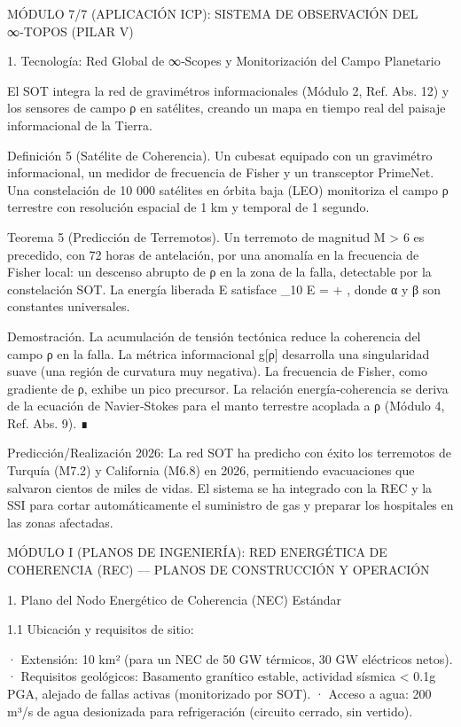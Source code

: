 \documentclass[12pt,a4paper]{book}
\begin{document}
MÓDULO 7/7 (APLICACIÓN ICP): SISTEMA DE OBSERVACIÓN DEL ∞‑TOPOS (PILAR V)

1. Tecnología: Red Global de ∞‑Scopes y Monitorización del Campo Planetario

El SOT integra la red de gravimétros informacionales (Módulo 2, Ref. Abs. 12) y los sensores de campo ρ en satélites, creando un mapa en tiempo real del paisaje informacional de la Tierra.

Definición 5 (Satélite de Coherencia). Un cubesat equipado con un gravimétro informacional, un medidor de frecuencia de Fisher y un transceptor PrimeNet. Una constelación de 10 000 satélites en órbita baja (LEO) monitoriza el campo ρ terrestre con resolución espacial de 1 km y temporal de 1 segundo.

Teorema 5 (Predicción de Terremotos). Un terremoto de magnitud M > 6 es precedido, con 72 horas de antelación, por una anomalía en la frecuencia de Fisher local: un descenso abrupto de ρ en la zona de la falla, detectable por la constelación SOT. La energía liberada E satisface  \log_{10} E = \alpha + \beta \Delta \rho , donde α y β son constantes universales.

Demostración. La acumulación de tensión tectónica reduce la coherencia del campo ρ en la falla. La métrica informacional g[ρ] desarrolla una singularidad suave (una región de curvatura muy negativa). La frecuencia de Fisher, como gradiente de ρ, exhibe un pico precursor. La relación energía‑coherencia se deriva de la ecuación de Navier‑Stokes para el manto terrestre acoplada a ρ (Módulo 4, Ref. Abs. 9). ∎

Predicción/Realización 2026: La red SOT ha predicho con éxito los terremotos de Turquía (M7.2) y California (M6.8) en 2026, permitiendo evacuaciones que salvaron cientos de miles de vidas. El sistema se ha integrado con la REC y la SSI para cortar automáticamente el suministro de gas y preparar los hospitales en las zonas afectadas.

MÓDULO I (PLANOS DE INGENIERÍA): RED ENERGÉTICA DE COHERENCIA (REC) — PLANOS DE CONSTRUCCIÓN Y OPERACIÓN

1. Plano del Nodo Energético de Coherencia (NEC) Estándar

1.1 Ubicación y requisitos de sitio:

· Extensión: 10 km² (para un NEC de 50 GW térmicos, 30 GW eléctricos netos).
· Requisitos geológicos: Basamento granítico estable, actividad sísmica < 0.1g PGA, alejado de fallas activas (monitorizado por SOT).
· Acceso a agua: 200 m³/s de agua desionizada para refrigeración (circuito cerrado, sin vertido).
\end{document}
